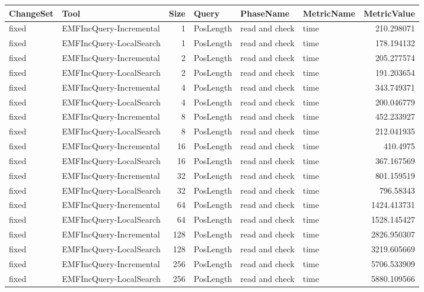 \begin{table}
\centering
\footnotesize
\begin{tabular}{| l | l | r | l | l | l | r |}
\hline
\sf ChangeSet & \sf Tool & \sf Size & \sf Query & \sf PhaseName & \sf MetricName & \sf MetricValue\\\hline
fixed & EMFIncQuery-Incremental & 1 & PosLength & read and check & time & 210.298071\\\hline
fixed & EMFIncQuery-LocalSearch & 1 & PosLength & read and check & time & 178.194132\\\hline
fixed & EMFIncQuery-Incremental & 2 & PosLength & read and check & time & 205.277574\\\hline
fixed & EMFIncQuery-LocalSearch & 2 & PosLength & read and check & time & 191.203654\\\hline
fixed & EMFIncQuery-Incremental & 4 & PosLength & read and check & time & 343.749371\\\hline
fixed & EMFIncQuery-LocalSearch & 4 & PosLength & read and check & time & 200.046779\\\hline
fixed & EMFIncQuery-Incremental & 8 & PosLength & read and check & time & 452.233927\\\hline
fixed & EMFIncQuery-LocalSearch & 8 & PosLength & read and check & time & 212.041935\\\hline
fixed & EMFIncQuery-Incremental & 16 & PosLength & read and check & time & 410.4975\\\hline
fixed & EMFIncQuery-LocalSearch & 16 & PosLength & read and check & time & 367.167569\\\hline
fixed & EMFIncQuery-Incremental & 32 & PosLength & read and check & time & 801.159519\\\hline
fixed & EMFIncQuery-LocalSearch & 32 & PosLength & read and check & time & 796.58343\\\hline
fixed & EMFIncQuery-Incremental & 64 & PosLength & read and check & time & 1424.413731\\\hline
fixed & EMFIncQuery-LocalSearch & 64 & PosLength & read and check & time & 1528.145427\\\hline
fixed & EMFIncQuery-Incremental & 128 & PosLength & read and check & time & 2826.950307\\\hline
fixed & EMFIncQuery-LocalSearch & 128 & PosLength & read and check & time & 3219.605669\\\hline
fixed & EMFIncQuery-Incremental & 256 & PosLength & read and check & time & 5706.533909\\\hline
fixed & EMFIncQuery-LocalSearch & 256 & PosLength & read and check & time & 5880.109566\\\hline

\end{tabular}
\end{table}
